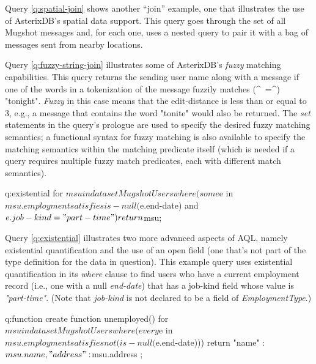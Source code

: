 Query \ref{q:spatial-join} shows another ``join'' example, one that illustrates the use of AsterixDB's spatial data support. 
This query goes through the set of all Mugshot messages and, for each one, uses a nested query to pair it with a bag of messages sent from nearby locations.


Query \ref{q:fuzzy-string-join} illustrates some of AsterixDB's \emph{fuzzy} matching capabilities.
This query returns the sending user name along with a message if one of the words in a tokenization of the message fuzzily matches (^~=^) "tonight".
\emph{Fuzzy} in this case means that the edit-distance is less than or equal to 3, e.g., a message that contains the word "tonite" would also be returned. 
The \emph{set} statements in the query's prologue are used to specify the desired fuzzy matching semantics;  a functional syntax for fuzzy matching is also available to specify the matching semantics within the matching predicate itself (which is needed if a query requires multiple fuzzy match predicates, each with different match semantics).

\begin{query}{q:existential}
for $msu in dataset MugshotUsers
where (some $e in $msu.employment 
       satisfies is-null($e.end-date)
         and $e.job-kind = "part-time")
return $msu;
\end{query}

Query \ref{q:existential} illustrates two more advanced aspects of AQL, namely existential quantification and the use of an open field (one that's not part of the type definition for the data in question).
This example query uses existential quantification in its \emph{where} clause to find users who have a current employment record (i.e., one with a null \emph{end-date}) that has a job-kind field whose value is \emph{"part-time"}.
(Note that \emph{job-kind} is not declared to be a field of \emph{EmploymentType}.)

\begin{query}{q:function}
create function unemployed() {
  for $msu in dataset MugshotUsers
  where (every $e in $msu.employment 
         satisfies not(is-null($e.end-date)))
  return {
    "name" : $msu.name,
    "address" : $msu.address
  }
};
\end{query}

